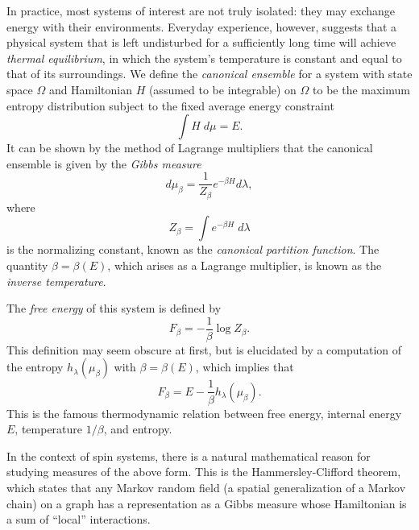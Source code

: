 In practice, most systems of interest are not truly isolated: they may exchange
energy with their environments. Everyday experience, however, suggests that
a physical system that is left undisturbed for a sufficiently long time will achieve \emph{thermal equilibrium}, in which the system's temperature is constant and equal to that of its surroundings. We define the \emph{canonical ensemble} for a system with state space $\Omega$ and Hamiltonian $H$
(assumed to be integrable) on
$\Omega$ to be the maximum entropy distribution subject to the fixed average energy constraint
\begin{equation}
\int H \; d\mu = E.
\end{equation}
It can be shown by the method of Lagrange multipliers that the canonical ensemble is given by the \emph{Gibbs measure}
\begin{equation}
\label{e:gibbs}
d\mu_\beta = \frac{1}{Z_\beta} e^{-\beta H} d\lambda,
\end{equation}
where
\begin{equation}
Z_\beta = \int e^{-\beta H} \; d\lambda
\end{equation}
is the normalizing constant, known as the \emph{canonical partition function}.
The quantity $\beta = \beta(E)$, which arises as a Lagrange multiplier, is known as the \emph{inverse temperature}.

The \emph{free energy} of this system is defined by
\begin{equation}
F_\beta = -\frac{1}{\beta} \log Z_\beta.
\end{equation}
This definition may seem obscure at first, but is elucidated by a computation of the entropy $h_\lambda(\mu_\beta)$ with $\beta = \beta(E)$, which implies that
\begin{equation}
F_\beta = E - \frac{1}{\beta} h_\lambda(\mu_\beta).
\end{equation}
This is the famous thermodynamic relation between free energy, internal energy $E$, temperature $1/\beta$, and entropy.


In the context of spin systems, there is a natural mathematical reason for studying measures of the above form. This is the Hammersley-Clifford theorem, which states that any Markov random field (a spatial generalization of a Markov chain) on a graph has a representation as a Gibbs measure whose Hamiltonian is a sum of ``local'' interactions.


